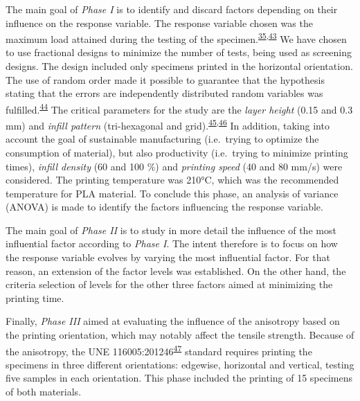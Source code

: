 \documentclass[
  12pt]{article}
\begin{document}
The main goal of \emph{Phase I} is to identify and discard factors depending on their influence on the response variable.
The response variable chosen was the maximum load attained during the testing of the specimen.\textsuperscript{\protect\hyperlink{ref-Kumar2018b}{35},\protect\hyperlink{ref-Chacon2017}{43}}
We have chosen to use fractional designs to minimize the number of tests, being used as screening designs.
The design included only specimens printed in the horizontal orientation.
The use of random order made it possible to guarantee that the hypothesis stating that the errors are independently distributed random variables was fulfilled.\textsuperscript{\protect\hyperlink{ref-Montgomery2001}{44}}
The critical parameters for the study are the \emph{layer height} (0.15 and 0.3 mm) and \emph{infill pattern} (tri-hexagonal and grid).\textsuperscript{\protect\hyperlink{ref-Singh2019}{45},\protect\hyperlink{ref-Tanveer2019}{46}}
In addition, taking into account the goal of sustainable manufacturing (i.e.~trying to optimize the consumption of material), but also productivity (i.e.~trying to minimize printing times), \emph{infill density} (60 and 100 \%) and \emph{printing speed} (40 and 80 mm/s) were considered.
The printing temperature was 210°C, which was the recommended temperature for PLA material.
To conclude this phase, an analysis of variance (ANOVA) is made to identify the factors influencing the response variable.

The main goal of \emph{Phase II} is to study in more detail the influence of the most influential factor according to \emph{Phase I}.
The intent therefore is to focus on how the response variable evolves by varying the most influential factor.
For that reason, an extension of the factor levels was established.
On the other hand, the criteria selection of levels for the other three factors aimed at minimizing the printing time.

Finally, \emph{Phase III} aimed at evaluating the influence of the anisotropy based on the printing orientation, which may notably affect the tensile strength.
Because of the anisotropy, the UNE 116005:201246\textsuperscript{\protect\hyperlink{ref-UNE}{47}} standard requires printing the specimens in three different orientations: edgewise, horizontal and vertical, testing five samples in each orientation.
This phase included the printing of 15 specimens of both materials.
\end{document}

